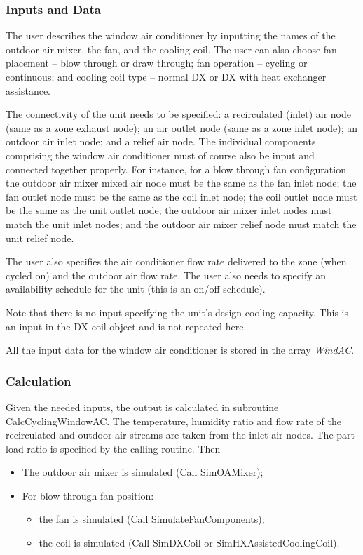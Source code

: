 \subsubsection{Inputs and Data}\label{inputs-and-data-5}

The user describes the window air conditioner by inputting the names of the outdoor air mixer, the fan, and the cooling coil. The user can also choose fan placement -- blow through or draw through; fan operation -- cycling or continuous; and cooling coil type -- normal DX or DX with heat exchanger assistance.

The connectivity of the unit needs to be specified: a recirculated (inlet) air node (same as a zone exhaust node); an air outlet node (same as a zone inlet node); an outdoor air inlet node; and a relief air node. The individual components comprising the window air conditioner must of course also be input and connected together properly. For instance, for a blow through fan configuration the outdoor air mixer mixed air node must be the same as the fan inlet node; the fan outlet node must be the same as the coil inlet node; the coil outlet node must be the same as the unit outlet node; the outdoor air mixer inlet nodes must match the unit inlet nodes; and the outdoor air mixer relief node must match the unit relief node.

The user also specifies the air conditioner flow rate delivered to the zone (when cycled on) and the outdoor air flow rate. The user also needs to specify an availability schedule for the unit (this is an on/off schedule).

Note that there is no input specifying the unit's design cooling capacity. This is an input in the DX coil object and is not repeated here.

All the input data for the window air conditioner is stored in the array \emph{WindAC}.

\subsubsection{Calculation}\label{calculation-4}

Given the needed inputs, the output is calculated in subroutine CalcCyclingWindowAC. The temperature, humidity ratio and flow rate of the recirculated and outdoor air streams are taken from the inlet air nodes. The part load ratio is specified by the calling routine. Then

\begin{itemize}
\item The outdoor air mixer is simulated (Call SimOAMixer);
\item For blow-through fan position:
\begin{itemize}
\item the fan is simulated (Call SimulateFanComponents);
\item the coil is simulated (Call SimDXCoil or SimHXAssistedCoolingCoil).
\end{itemize}
\end{itemize}


